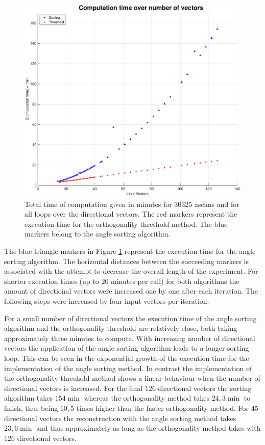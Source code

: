 \begin{figure}[H]
    \centering
    \includegraphics[width=1\linewidth]{Graphics/Results/complete_computation_time_over_numer_vec.eps}
    \caption{Total time of computation given in minutes for 30325 \acp{ascan} and for all loops over the directional vectors. The red markers represent the execution time for the orthogonality threshold method. The blue markers belong to the angle sorting algorithm.}
    \label{fig:Complete_computation_all_vecs}
\end{figure}

The blue triangle markers in Figure \ref{fig:Complete_computation_all_vecs} represent the execution time for the angle sorting algorithm. The horizontal distances between the succeeding markers is associated with the attempt to decrease the overall length of the experiment. For shorter execution times (up to 20 minutes per call) for both algorithms the amount of directional vectors were increased one by one after each iteration. The following steps were increased by four input vectors per iteration.

For a small number of directional vectors the execution time of the angle sorting algorithm and the orthogonality threshold are relatively close, both taking approximately three minutes to compute. With increasing number of directional vectors the application of the angle sorting algorithm leads to a longer sorting loop. This can be seen in the exponential growth of the execution time for the implementation of the angle sorting method. In contrast the implementation of the orthogonality threshold method shows a linear behaviour when the number of directional vectors is increased. For the final 126 directional vectors the sorting algorithm takes $154 \min$ whereas the orthogonality method takes $24,3 \min$ to finish, thus being $10,5$ times higher than the faster orthogonality method. For 45 directional vectors the reconstruction with the angle sorting method takes $23,6 \min$ and thus approximately as long as the orthogonality method takes with 126 directional vectors.

